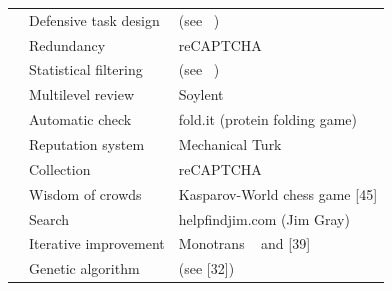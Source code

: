 \documentclass{acm_proc_article-sp}
\begin{document}
\begin{figure}[t]
\begin{tabular}{|l|l|l|}
\multicolumn{1}{|l|}{\textbf{}}            & \multicolumn{1}{l|}{Defensive task design}                     & \multicolumn{1}{l|}{(see ~\cite{callison2010})}                                 \\ \cline{2-3}
\multicolumn{1}{|l|}{\textbf{}}            & \multicolumn{1}{l|}{Redundancy}                                & \multicolumn{1}{l|}{reCAPTCHA}                                     \\  \cline{2-3}
\multicolumn{1}{|l|}{\textbf{}}            & \multicolumn{1}{l|}{Statistical filtering}                     & \multicolumn{1}{l|}{(see ~\cite{chen2009})}                             \\  \cline{2-3}
\multicolumn{1}{|l|}{\textbf{}}            & \multicolumn{1}{l|}{Multilevel review}                         & \multicolumn{1}{l|}{Soylent ~\cite{bernstein2015}}                               \\  \cline{2-3}
\multicolumn{1}{|l|}{\textbf{}}            & \multicolumn{1}{l|}{Automatic check}                           & \multicolumn{1}{l|}{fold.it (protein folding game) ~\cite{cooper2010}}       \\  \cline{2-3}
\textbf{}                                  & Reputation system                                              & Mechanical Turk                                                    \\  \Xhline{1mm}
\multicolumn{1}{|l|}{\textbf{Aggregation}} & \multicolumn{1}{l|}{Collection}                                & \multicolumn{1}{l|}{reCAPTCHA}                                     \\  \cline{2-3}
\multicolumn{1}{|l|}{\textbf{}}            & \multicolumn{1}{l|}{Wisdom of crowds}                          & \multicolumn{1}{l|}{Kasparov-World chess game {[}45{]}}            \\  \cline{2-3}
\multicolumn{1}{|l|}{\textbf{}}            & \multicolumn{1}{l|}{Search}                                    & \multicolumn{1}{l|}{helpfindjim.com (Jim Gray)}                    \\  \cline{2-3}
\multicolumn{1}{|l|}{\textbf{}}            & \multicolumn{1}{l|}{Iterative improvement}                     & \multicolumn{1}{l|}{Monotrans ~\cite{hu2010} and {[}39{]}}             \\  \cline{2-3}
\multicolumn{1}{|l|}{\textbf{}}            & \multicolumn{1}{l|}{Genetic algorithm}                         & \multicolumn{1}{l|}{(see {[}32{]})}                                \\  \cline{2-3}

\end{tabular}
\end{figure}
\end{document}
